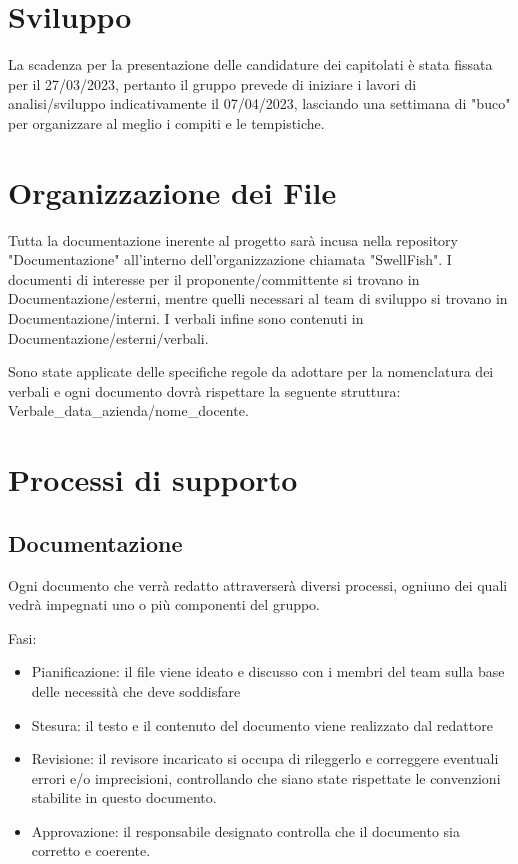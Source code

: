 \documentclass[12pt]{article}
\begin{document}
\section{Sviluppo}
La scadenza per la presentazione delle candidature dei capitolati è stata fissata per il 27/03/2023, pertanto il gruppo prevede di iniziare i lavori di analisi/sviluppo indicativamente il 07/04/2023, lasciando una settimana di "buco" per organizzare al meglio i compiti e le tempistiche.

\section{Organizzazione dei File}
Tutta la documentazione inerente al progetto sarà incusa nella repository "Documentazione" all'interno dell'organizzazione chiamata "SwellFish".
I documenti di interesse per il proponente/committente si trovano in Documentazione/esterni, mentre quelli necessari al team di sviluppo si trovano in Documentazione/interni. I verbali infine sono contenuti in Documentazione/esterni/verbali.

Sono state applicate delle specifiche regole da adottare per la nomenclatura dei verbali e ogni documento dovrà rispettare la seguente struttura: Verbale_data_azienda/nome_docente.

\section{Processi di supporto}
\subsection{Documentazione}
Ogni documento che verrà redatto attraverserà diversi processi, ogniuno dei quali vedrà impegnati uno o più componenti del gruppo.

Fasi:
\begin{itemize}
    \item Pianificazione: il file viene ideato e discusso con i membri del team sulla base delle necessità che deve soddisfare
    \item Stesura: il testo e il contenuto del documento viene realizzato dal redattore
    \item Revisione: il revisore incaricato si occupa di rileggerlo e correggere eventuali errori e/o imprecisioni, controllando che siano state rispettate le convenzioni stabilite in questo documento.
    \item Approvazione: il responsabile designato controlla che il documento sia corretto e coerente.
\end{itemize}
\end{document}
